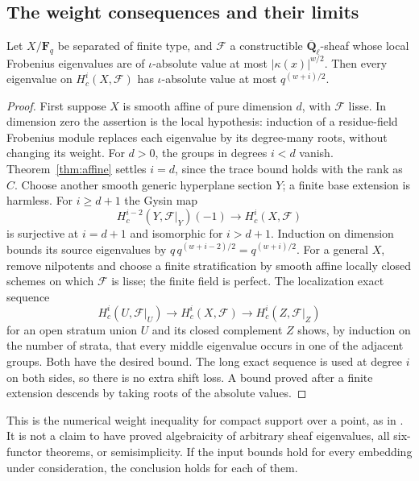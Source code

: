 \subsection{The weight consequences and their limits}

\begin{corollary}
\label{cor:upper}
Let $X/\mathbf F_q$ be separated of finite type, and $\mathcal F$ a
constructible $\overline{\mathbf Q}_\ell$-sheaf whose local Frobenius
eigenvalues are of $\iota$-absolute value at most $|\kappa(x)|^{w/2}$.
Then every eigenvalue on $H_c^i(X,\mathcal F)$ has $\iota$-absolute
value at most $q^{(w+i)/2}$.
\end{corollary}
\begin{proof}
First suppose $X$ is smooth affine of pure dimension $d$, with
$\mathcal F$ lisse.  In dimension zero the assertion is the local
hypothesis: induction of a residue-field Frobenius module replaces
each eigenvalue by its degree-many roots, without changing its weight.
For $d>0$, the groups in degrees $i<d$ vanish.  Theorem~\ref{thm:affine}
settles $i=d$, since the trace bound holds with the rank as $C$.
Choose another smooth generic hyperplane section $Y$; a finite base
extension is harmless.  For $i\ge d+1$ the Gysin map
\[
 H_c^{i-2}(Y,\mathcal F|_Y)(-1)\longrightarrow H_c^i(X,\mathcal F)
\]
is surjective at $i=d+1$ and isomorphic for $i>d+1$.
Induction on dimension bounds its source eigenvalues by
$q\,q^{(w+i-2)/2}=q^{(w+i)/2}$.
For a general $X$, remove nilpotents and choose a finite stratification
by smooth affine locally closed schemes on which $\mathcal F$ is lisse;
the finite field is perfect.  The localization exact sequence
\[
 H_c^i(U,\mathcal F|_U)\longrightarrow H_c^i(X,\mathcal F)
                   \longrightarrow H_c^i(Z,\mathcal F|_Z)
\]
for an open stratum union $U$ and its closed complement $Z$ shows,
by induction on the number of strata, that every middle eigenvalue
occurs in one of the adjacent groups.  Both have the desired bound.
The long exact sequence is used at degree $i$ on both sides, so there
is no extra shift loss.  A bound proved after a finite extension
descends by taking roots of the absolute values.
\end{proof}

This is the numerical weight inequality for compact support over a point,
as in \cite[Theorem 3.3.1]{WeilII}.  It is not a claim to have proved
algebraicity of arbitrary sheaf eigenvalues, all six-functor theorems,
or semisimplicity.  If the input bounds hold for every embedding under
consideration, the conclusion holds for each of them.

